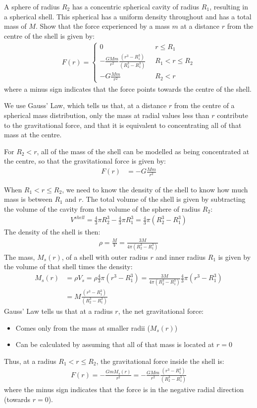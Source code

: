 \question A sphere of radius $R_2$ has a concentric spherical cavity of radius $R_1$, resulting in a spherical shell. This spherical has a uniform density throughout and has a total mass of $M$. Show that the force experienced by a mass $m$ at a distance $r$ from the centre of the shell is given by:
\begin{align*}
F(r) = \begin{cases}
0 &\;\; r \leq R_1\\
-\frac{GMm}{r^2}\frac{(r^3-R_1^3)}{(R_2^3-R_1^3)}  &\;\; R_1<r\leq R_2\\
-G\frac{Mm}{r^2} &\;\; R_2<r
\end{cases}
\end{align*}
where a minus sign indicates that the force points towards the centre of the shell.
\begin{solution}
We use Gauss' Law, which tells us that, at a distance $r$ from the centre of a spherical mass distribution, only the mass at radial values less than $r$ contribute to the gravitational force, and that it is equivalent to concentrating all of that mass at the centre.

For $R_2<r$, all of the mass of the shell can be modelled as being concentrated at the centre, so that the gravitational force is given by:
\begin{align*}
F(r) &= -G\frac{Mm}{r^2}
\end{align*}


When  $R_1<r\leq R_2$, we need to know the density of the shell to know how much mass is between $R_1$ and $r$. The total volume of the shell is given by subtracting the volume of the cavity from the volume of the sphere of radius $R_2$:
\begin{align*}
V^{shell}=\frac{4}{3}\pi R_2^3-\frac{4}{3}\pi R_1^3=\frac{4}{3}\pi (R_2^3-R_1^3)
\end{align*}
The density of the shell is then:
\begin{align*}
\rho=\frac{M}{V}=\frac{3M}{4\pi (R_2^3-R_1^3)}
\end{align*}
The mass, $M_s(r)$, of a shell with outer radius $r$ and inner radius $R_1$ is given by the volume of that shell times the density:
\begin{align*}
M_s(r)&=\rho V_s=\rho \frac{4}{3}\pi (r^3-R_1^3)=\frac{3M}{4\pi (R_2^3-R_1^3)}\frac{4}{3}\pi (r^3-R_1^3)\\
&=M\frac{(r^3-R_1^3)}{(R_2^3-R_1^3)} 
\end{align*}
Gauss' Law tells us that at a radius $r$, the net gravitational force:
\begin{itemize}
\item Comes only from the mass at smaller radii ($M_s(r)$)
\item Can be calculated by assuming that all of that mass is located at $r=0$
\end{itemize}
Thus, at a radius $R_1<r\leq R_2$, the gravitational force inside the shell is:
\begin{align*}
F(r) = -\frac{GmM_s(r)}{r^2} = -\frac{GMm}{r^2}\frac{(r^3-R_1^3)}{(R_2^3-R_1^3)} 
\end{align*}
where the minus sign indicates that the force is in the negative radial direction (towards $r=0$).


\end{solution}
